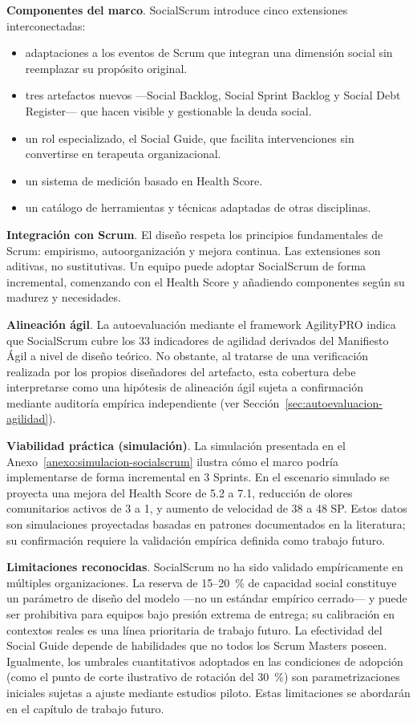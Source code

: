 \textbf{Componentes del marco}. SocialScrum introduce cinco extensiones interconectadas:
\begin{itemize}
    \item adaptaciones a los eventos de Scrum que integran una dimensión social sin reemplazar su propósito original.
    \item tres artefactos nuevos ---Social Backlog, Social Sprint Backlog y Social Debt Register--- que hacen visible y gestionable la deuda social.
    \item un rol especializado, el Social Guide, que facilita intervenciones sin convertirse en terapeuta organizacional.
    \item un sistema de medición basado en Health Score.
    \item un catálogo de herramientas y técnicas adaptadas de otras disciplinas.
\end{itemize}

\textbf{Integración con Scrum}. El diseño respeta los principios fundamentales de Scrum: empirismo, autoorganización y mejora continua. Las extensiones son aditivas, no sustitutivas. Un equipo puede adoptar SocialScrum de forma incremental, comenzando con el Health Score y añadiendo componentes según su madurez y necesidades.

\textbf{Alineación ágil}. La autoevaluación mediante el framework AgilityPRO indica que SocialScrum cubre los 33 indicadores de agilidad derivados del Manifiesto Ágil a nivel de diseño teórico. No obstante, al tratarse de una verificación realizada por los propios diseñadores del artefacto, esta cobertura debe interpretarse como una hipótesis de alineación ágil sujeta a confirmación mediante auditoría empírica independiente (ver Sección~\ref{sec:autoevaluacion-agilidad}).

\textbf{Viabilidad práctica (simulación)}. La simulación presentada en el Anexo~\ref{anexo:simulacion-socialscrum} ilustra cómo el marco podría implementarse de forma incremental en 3 Sprints. En el escenario simulado se proyecta una mejora del Health Score de 5.2 a 7.1, reducción de olores comunitarios activos de 3 a 1, y aumento de velocidad de 38 a 48 SP. Estos datos son simulaciones proyectadas basadas en patrones documentados en la literatura; su confirmación requiere la validación empírica definida como trabajo futuro.

\textbf{Limitaciones reconocidas}. SocialScrum no ha sido validado empíricamente en múltiples organizaciones. La reserva de 15--20~\% de capacidad social constituye un parámetro de diseño del modelo ---no un estándar empírico cerrado--- y puede ser prohibitiva para equipos bajo presión extrema de entrega; su calibración en contextos reales es una línea prioritaria de trabajo futuro. La efectividad del Social Guide depende de habilidades que no todos los Scrum Masters poseen. Igualmente, los umbrales cuantitativos adoptados en las condiciones de adopción (como el punto de corte ilustrativo de rotación del 30~\%) son parametrizaciones iniciales sujetas a ajuste mediante estudios piloto. Estas limitaciones se abordarán en el capítulo de trabajo futuro.

